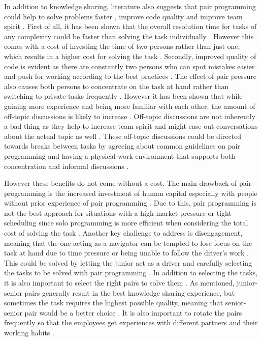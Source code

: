 In addition to knowledge sharing, literature also suggests that pair programming could help to solve problems faster \citep{Hannay2009}\citep{Lui2010}\citep{Wray2010}, improve code quality
\citep{Hannay2009}\citep{Williams2010}\citep{Wray2010} and improve team spirit \citep{Maguire2014}\citep{Stapel2010}\citep{Williams2010}. First of all, it has been shown that the overall resolution
time for tasks of any complexity could be faster than solving the task individually \citep{Hannay2009}\citep{Lui2010}\citep{Sun2009}. However this comes with a cost of investing the time
of two persons rather than just one, which results in a higher cost for solving the task \citep{Lui2010}\citep{Spohrer2013}\citep{Williams2010}. Secondly, improved quality of code is evident as there are constantly
two persons who can spot mistakes easier \citep{Spohrer2013}\citep{Wray2010} and push for working according to the best practices \citep{Williams2010}\citep{Wray2010}. The effect of pair pressure also
causes both persons to concentrate on the task at hand rather than switching to private tasks frequently \citep{Sillitti2011}\citep{Stapel2010}\citep{Williams2010}\citep{Wray2010}. However it has been
shown that while gaining more experience and being more familiar with each other, the amount of off-topic discussions is likely to increase \citep{Stapel2010}. Off-topic discussions are not inherently
a bad thing as they help to increase team spirit and might ease out conversations about the actual topic as well \citep{Williams2010}. These off-topic discussions could be directed towards breaks between
tasks by agreeing about common guidelines on pair programming \citep{Maguire2014} and having a physical work environment that supports both concentration and informal discussions \citep{Mishra2009a}.

However these benefits do not come without a cost. The main drawback of pair programming is the increased investment of human capital especially with people without prior experience of
pair programming \citep{Spohrer2013}\citep{Williams2010}. Due to this, pair programming is not the best approach for situations with a high market pressure or tight scheduling since solo programming
is more efficient when considering the total cost of solving the task \citep{Sun2009}. Another key challenge to address is disengagement, meaning that the one acting as a navigator can be tempted
to lose focus on the task at hand due to time pressure or being unable to follow the driver's work \citep{Plonka2012}\citep{Williams2010}. This could be solved by letting the junior act as a driver and carefully selecting
the tasks to be solved with pair programming \citep{Plonka2012}. In addition to selecting the tasks, it is also important to select the right pairs to solve them
\citep{Gupta2013}\citep{Hannay2009}\citep{Sun2009}\citep{Williams2010}. As mentioned, junior-senior pairs generally result in the best knowledge sharing experience,
but sometimes the task requires the highest possible quality, meaning that
senior-senior pair would be a better choice \citep{Sun2009}. It is also important to rotate the pairs frequently so that the employees get experiences with different partners and their working habits \citep{Spohrer2013}\citep{Williams2010}.

